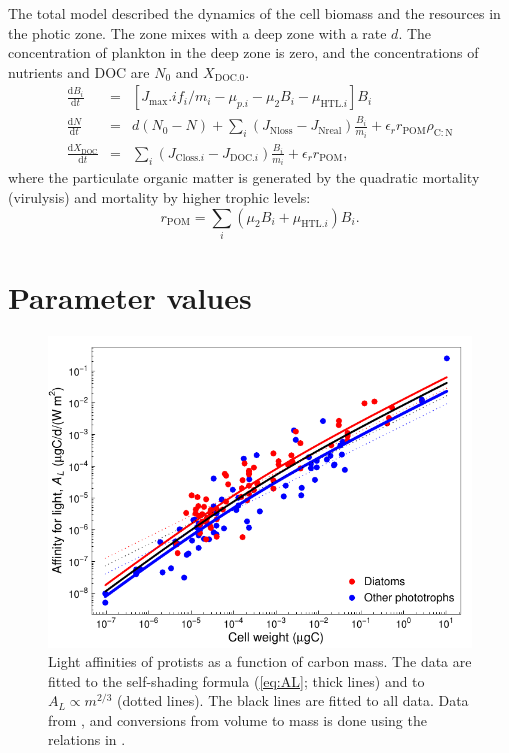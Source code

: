\documentclass[11pt]{article}
\newcommand{\Jmax}[1][]{J_\mathrm{max}#1}
\newcommand{\DOC}{\mathrm{DOC}}
\newcommand{\POM}{\mathrm{POM}}
\newcommand{\rCN}{\rho_\mathrm{C:N}}
\renewcommand{\d}{\mathrm{d}}
\begin{document}
The total model described the dynamics of the cell biomass and the resources in the photic zone. The zone mixes with a deep zone with a rate $d$.  The concentration of plankton in the deep zone is zero, and the concentrations of nutrients and DOC are $N_0$ and $X_\mathrm{DOC.0}$. 
\begin{eqnarray}
  \frac{\d B_i}{\d t} &=& \left[  \Jmax[.i] f_i/m_i - \mu_{p.i} - \mu_2 B_i - \mu_{\mathrm{HTL}.i} \right] B_i \\
  \frac{\d N}{\d t} &=& d(N_0 - N) + \sum_i (J_\mathrm{Nloss} -J_\mathrm{Nreal}) \frac{B_i}{m_i} + \epsilon_r r_\POM\rCN \\
  \frac{\d X_\DOC}{\d t} &=&  \sum_i (J_{\mathrm{Closs}.i} -  J_{\DOC.i})\frac{B_i}{m_i}  + \epsilon_r r_\POM, \end{eqnarray}
where the particulate organic matter is generated by the quadratic mortality (virulysis) and mortality by higher trophic levels:
\begin{equation}
  r_\POM = \sum_i (\mu_2 B_i + \mu_{\mathrm{HTL}.i})B_i.
\end{equation}

\section*{Parameter values}

\begin{figure}[t]
  \centering
  \includegraphics{AL.pdf}
  \caption{Light affinities of protists as a function of carbon mass.  The data are fitted to the self-shading formula (\ref{eq:AL}; thick lines) and to $A_L\propto m^{2/3}$ (dotted lines).  The black lines are fitted to all data.  Data from \citet{Edwards2015}, and conversions from volume to mass is done using the relations in \cite{MendenDeuer2000}.}
  \label{fig:AL}
\end{figure}
\end{document}
